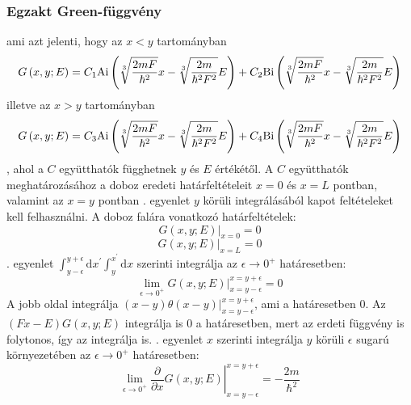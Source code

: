 \subsubsection{Egzakt Green-függvény}
ami azt jelenti, hogy az $x < y$ tartományban
\begin{equation}
    G\left(x, y; E\right) = C_1 \mathrm{Ai}\left(\sqrt[3]{\frac{2mF}{\hbar^2}}x - \sqrt[3]{\frac{2m}{\hbar^2F^2}}E\right) + C_2 \mathrm{Bi}\left(\sqrt[3]{\frac{2mF}{\hbar^2}}x - \sqrt[3]{\frac{2m}{\hbar^2F^2}}E\right)
    \label{green:xy}
\end{equation}
illetve az $x > y$ tartományban
\begin{equation}
    G\left(x, y; E\right) = C_3 \mathrm{Ai}\left(\sqrt[3]{\frac{2mF}{\hbar^2}}x - \sqrt[3]{\frac{2m}{\hbar^2F^2}}E\right) + C_4 \mathrm{Bi}\left(\sqrt[3]{\frac{2mF}{\hbar^2}}x - \sqrt[3]{\frac{2m}{\hbar^2F^2}}E\right)
    \label{green:yx}
\end{equation}
, ahol a $C$ együtthatók függhetnek $y$ és $E$ értékétől. A $C$ együtthatók meghatározásához a doboz eredeti határfeltételeit $x = 0$ és $x = L$ pontban, valamint az $x = y$ pontban . egyenlet $y$ körüli integrálásából kapot feltételeket kell felhasználni. A doboz falára vonatkozó határfeltételek:
\begin{equation}
	\left. G\left(x,y;E\right)\right\rvert_{x = 0} = 0
\end{equation}
\begin{equation}
	\left. G\left(x,y;E\right)\right\rvert_{x = L} = 0
\end{equation}
. egyenlet $\int_{y-\epsilon}^{y+\epsilon}\mathrm{d}x^\prime \int_{y}^{x^\prime} \mathrm{d}x$ szerinti integrálja az $\epsilon \to 0^+$ határesetben: 
\begin{equation}
	\lim_{\epsilon \to 0^+}\left.G\left(x,y;E \right)\right\rvert_{x = y - \epsilon}^{x = y + \epsilon} = 0
\end{equation}
A jobb oldal integrálja $\left. \left(x - y\right) \theta\left(x - y\right) \right\rvert_{x=y-\epsilon}^{x=y+\epsilon}$, ami a határesetben $0$. Az $\left(Fx - E\right)G\left(x,y;E\right)$ integrálja is $0$ a határesetben, mert az erdeti függvény is folytonos, így az integrálja is. . egyenlet $x$ szerinti integrálja $y$ körüli $\epsilon$ sugarú környezetében az $\epsilon \to 0^+$ határesetben:
\begin{equation}
	\lim_{\epsilon \to 0^+}\left.\frac{\partial}{\partial x}G\left(x,y;E \right)\right\rvert_{x = y - \epsilon}^{x = y + \epsilon} = -\frac{2m}{\hbar^2}
\end{equation}
